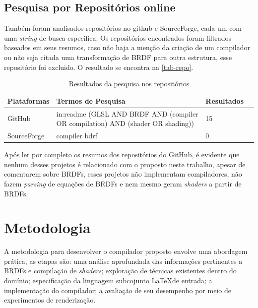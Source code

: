 \documentclass[english, 
               brazil, 
               bsc] %
               {dcomp-abntex2}
\begin{document}
\section{Pesquisa por Repositórios online}
Também foram analisados repositórios no github e SourceForge, cada um com uma \textit{string} de busca especifica. Os repositórios encontrados foram filtrados baseados em seus resumos, caso não haja a menção da criação de um compilador ou não seja citada uma transformação de BRDF para outra estrutura, esse repositório foi excluido. O resultado se encontra na \autoref{tab-repo}.



\begin{table}[H]
\ABNTEXfontereduzida
\caption[bases]{Resultados da pesquisa nos repositórios}
\label{tab-repo}
\begin{tabular}{p{2.6cm}|p{6.0cm}|p{2.25cm}|p{3.40cm}}
   \textbf{Plataformas} & \textbf{Termos de Pesquisa}  & \textbf{Resultados}\\
   \hline
   GitHub
   &
   in:readme (GLSL AND BRDF AND  (compiler OR compilation) AND (shader OR shading))
   & 15
   \\ \hline
   SourceForge
   &
   compiler bdrf
   & 0
\end{tabular}
\end{table}


Após ler por completo os resumos dos repositórios do GitHub, é evidente que nenhum desses projetos é relacionado com o proposto neste trabalho, apesar de comentarem sobre BRDFs, esses projetos não implementam compiladores, não fazem \textit{parsing} de equações de BRDFs e nem mesmo geram \textit{shaders} a partir de BRDFs.

\chapter{Metodologia} \label{metodologia}

A metodologia para desenvolver o compilador proposto envolve uma abordagem prática, as etapas são:  uma análise aprofundada das informações pertinentes a BRDFs e compilação de \textit{shaders}; exploração de técnicas existentes dentro do domínio;  especificação da linguagem subcojunto \LaTeX de entrada;  a implementação do compilador; a avaliação de seu desempenho por meio de experimentos de renderização.
\end{document}
